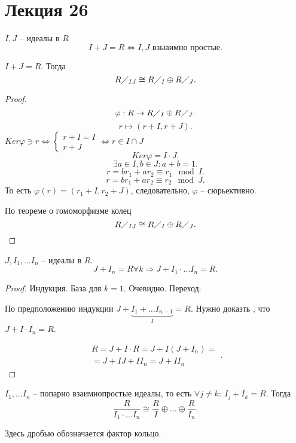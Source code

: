 \documentclass[12pt]{report}
\begin{document}
\section{Лекция 26}
$ I, J$ -- идеалы в $ R$ 
\[
I + J = R \Leftrightarrow  I, J \text{ взыаимно простые}
.\] 
\begin{lm}
    $ I + J = R$. Тогда \[
	R \diagup _ {IJ} \cong R \diagup_I \oplus R \diagup _ J
    .\] 
\end{lm}
\begin{proof}
    \[
    \varphi : R \to  R \diagup_I \oplus R \diagup _ J
    .\] 
    \[
	r \mapsto (r + I, r + J)
    .\] 
    $ Ker \varphi  \ni r \Leftrightarrow 
    \left \{ 
	\begin{array}{l}
	    r + I = I \\
	    r + J
	\end{array}
	 \right .
	 \Leftrightarrow r \in  I \cap  J
	$
	\[
	Ker \varphi  = I \cdot J
	.\] 
	\[
	\exists  a \in I, b \in J: a + b = 1
	.\] 
	\[
	r = br_1+ar_2 \equiv r_1 \mod I
	.\] 
	\[
	r = br_1+ar_2 \equiv r_2 \mod J
	.\] 
	То есть $ \varphi (r) =  (r_1 + I, r_2 + J)$, следовательно, $ \varphi $ -- сюрьективно.

	По теореме о гомоморфизме колец \[
	    R \diagup _{IJ} \cong R\diagup_I \oplus R\diagup_J
	.\] 
\end{proof}
\begin{lm}
    $ J, I_1, \ldots I_n $ --  идеалы в $ R$. 
    \[
    J + I_n = R \forall k \Longrightarrow J + I_1 \cdot \ldots I_n = R
    .\] 
\end{lm}
\begin{proof}
    Индукция.
    База для $ k=1$. Очевидно.
    Переход:

    По предположению индукции $ J + \underbrace{I_1 + \ldots  I_{n-1}}_{I} = R$. Нужно доказть , что $ J + I \cdot I_n = R$.

     \[
	 \begin{array}{l}
	     R = J + I\cdot R = J + I(J + I_n) = \\
	     = J + I J + I I _n  = J + I I_n
     \end{array}
     .\] 
\end{proof}
\begin{thm}
    $ I_1, \ldots  I_n$ -- попарно взаимнопростые идеалы, то есть $ \forall  j \ne k:~ I_j + I_k = R$.
    Тогда \[
	\frac{R}{I_1\cdot \ldots I_n } \cong \frac{R}{I} \oplus \ldots  \oplus \frac{R}{I_n}
    .\] 
    \begin{note}
        Здесь дробью обозначается фактор кольцо.
    \end{note}
\end{thm}
\end{document}
